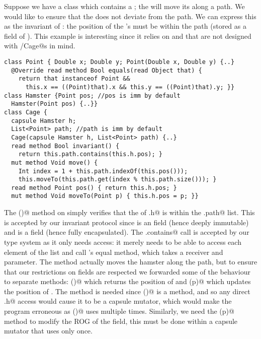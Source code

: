  
Suppose we have a \Q@Cage@ class which contains a \Q@Hamster@; the \Q@Cage@ will move its \Q@Hamster@ along a path. We would like to ensure that the \Q@Hamster@ does not deviate from the path. We can express this as the invariant of \Q@Cage@: the position of the \Q@Cage@'s \Q@Hamster@ must be within the path (stored as a field of \Q@Cage@).
This example is interesting since it relies on \Q@List@s and \Q@Point@s that are not designed with \Q@Hamster/Cage@s in mind.


%
\begin{lstlisting}
class Point { Double x; Double y; Point(Double x, Double y) {..}
  @Override read method Bool equals(read Object that) {
    return that instanceof Point &&
      this.x == ((Point)that).x && this.y == ((Point)that).y; }}
class Hamster {Point pos; //pos is imm by default
  Hamster(Point pos) {..}}
class Cage {
  capsule Hamster h;
  List<Point> path; //path is imm by default
  Cage(capsule Hamster h, List<Point> path) {..}
  read method Bool invariant() {
    return this.path.contains(this.h.pos); }
  mut method Void move() {
    Int index = 1 + this.path.indexOf(this.pos()));
    this.moveTo(this.path.get(index % this.path.size())); }
  read method Point pos() { return this.h.pos; }
  mut method Void moveTo(Point p) { this.h.pos = p; }}
\end{lstlisting}

The \Q@invariant()@ method on \Q@Cage@ simply verifies that the \Q@pos@ of \Q@this.h@ is within the \Q@this.path@ list. This is accepted by our invariant protocol since \Q@path@ is an \Q@imm@ field (hence deeply immutable) and \Q@h@ is a \Q@capsule@ field (hence fully encapsulated). The \Q@path.contains@ call is accepted by our type system as it only needs \Q@read@ access: it merely needs to be able to access each element of the list and call \Q@Point@'s equal method, which takes a \Q@read@ receiver and parameter.
The \Q@move@ method actually moves the hamster along the path, but to ensure that our restrictions on \Q@capsule@ fields are respected we forwarded some of the behaviour to separate methods: \Q@pos()@ which returns the position of \Q@h@ and \Q@moveTo(p)@ which updates the position of \Q@h@.
The \Q@pos@ method is needed since \Q@move()@ is a \Q@mut@ method, and so any direct \Q@this.h@ access would cause it to be a capsule mutator, which would make the program erroneous as \Q@move()@ uses \Q@this@ multiple times.
Similarly, we need the \Q@moveTo(p)@ method to modify the ROG of the \Q@h@ field, this must be done within a capsule mutator that uses \Q@this@ only once.

